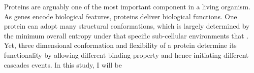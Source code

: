 Proteins are arguably one of the most important component in a living organism. As genes encode biological features, proteins deliver biological functions. One protein can adopt many structural conformations, which is largely determined by the minimum overall entropy under that specific sub-cellular environments that . Yet, three dimensional conformation and flexibility of a protein determine its functionality by allowing different binding property and hence initiating different cascades events. In this study, I will be 